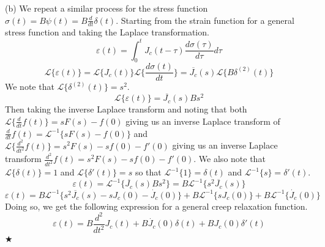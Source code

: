 \documentclass[preprint,12pt,authoryear]{elsarticle}
\begin{document}
(b) We repeat a similar process for the stress function $\sigma(t) = B \psi(t) = B \frac{d}{dt}\delta(t)$. Starting from the strain function for a general stress function and taking the Laplace transformation.
\begin{equation}
    \varepsilon(t) = \int_{0}^{t}J_c(t-\tau)\frac{d\sigma(\tau)}{d\tau}d\tau
\end{equation}
\begin{equation}
    \mathcal{L}\{ \varepsilon(t)\} = \mathcal{L}\{ J_c(t)\}\mathcal{L}\{ \frac{d \sigma(t)}{d t}\} = \overline{J_c}(s) \mathcal{L}\{ B\delta^{(2)}(t) \}
\end{equation}
We note that $\mathcal{L}\{ \delta^{(2)}(t) \} = s^2$.
\begin{equation}
    \mathcal{L}\{ \varepsilon(t)\} = \overline{J_c}(s) B s^2
\end{equation}
Then taking the inverse Laplace transform and noting that both $\mathcal{L} \{ \frac{d}{dt} f(t) \} = sF(s) - f(0)$ giving us an inverse Laplace transform of $ \frac{d}{dt} f(t) = \mathcal{L}^{-1} \{ sF(s) - f(0) \}$ and $\mathcal{L} \{ \frac{d^2}{dt^2} f(t) \} = s^2F(s) - sf(0) - f'(0)$ giving us an inverse Laplace transform $ \frac{d^2}{dt^2} f(t) = s^2F(s) - sf(0) - f'(0)$. We also note that $\mathcal{L}\{ \delta(t) \} = 1$ and $\mathcal{L}\{ \delta'(t) \} = s$ so that $\mathcal{L}^{-1}\{ 1 \} = \delta(t)$ and $\mathcal{L}^{-1}\{ s \} = \delta'(t)$.
\begin{equation}
    \varepsilon(t) = \mathcal{L}^{-1}\{ \overline{J_c}(s) B s^2 \} = B\mathcal{L}^{-1}\{ s^2\overline{J_c}(s) \}
\end{equation}
\begin{equation}
    \varepsilon(t) = B\mathcal{L}^{-1}\{ s^2\overline{J_c}(s)  - sJ_c(0) - \dot{J_c}(0)\} + B\mathcal{L}^{-1}\{ sJ_c(0)\} + B\mathcal{L}^{-1}\{ \dot{J_c}(0)\}
\end{equation}
Doing so, we get the following expression for a general creep relaxation function.
\begin{equation}
    \varepsilon(t) = B\frac{d^2}{dt^2}J_c(t) + B\dot{J_c}(0)\delta(t) + BJ_c(0)\delta'(t)
\end{equation}
\hspace*{\fill} $\bigstar$
\medskip
\end{document}
